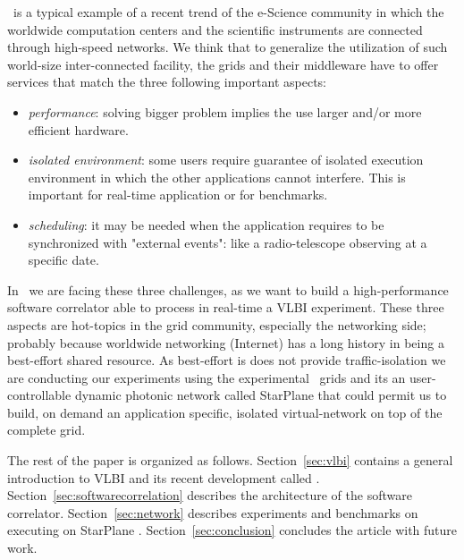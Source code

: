 \scarie\ is a typical example of a recent trend of the e-Science
community in which the worldwide computation centers and the
scientific instruments are connected through high-speed networks. We
think that to generalize the utilization of such world-size
inter-connected facility, the grids and their middleware have to
offer services that match the three following important aspects:
\begin{itemize}
\item \emph{performance}: solving bigger problem implies the use
  larger and/or more efficient hardware.
\item \emph{isolated environment}: some users require guarantee of
  isolated execution environment in which the other applications
  cannot interfere. This is important for real-time application or
  for benchmarks.
\item \emph{scheduling}: it may be needed when the application
  requires to be synchronized with "external events": like a
  radio-telescope observing at a specific date.
\end{itemize}
In \scarie\ we are facing these three challenges, as we want to build
a high-performance software correlator able to process in real-time a
VLBI experiment. These three aspects are hot-topics in the grid
community, especially the networking side; probably because worldwide
networking (Internet) has a long history in being a best-effort shared
resource. As best-effort is does not provide traffic-isolation we are
conducting our experiments using the experimental \ grids and its
an user-controllable dynamic photonic network called StarPlane that
could permit us to build, on demand an application specific, isolated
virtual-network on top of the complete grid.


The rest of the paper is organized as follows. Section~\ref{sec:vlbi}
contains a general introduction to VLBI and its recent development
called \evlbi. Section~\ref{sec:softwarecorrelation} describes the
architecture of the software correlator. Section~\ref{sec:network}
describes experiments and benchmarks on executing \scarie on StarPlane
. Section~\ref{sec:conclusion} concludes the article with future
work.


